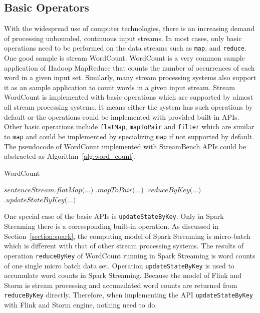 \subsection{Basic Operators}
\label{sub:basic_operator}

With the widespread use of computer technologies, there is an increasing demand of processing unbounded, continuous input streams. In most cases, only basic operations need to be performed on the data streams such as \texttt{map}, and \texttt{reduce}. One good sample is stream WordCount. WordCount is a very common sample application of Hadoop MapReduce that counts the number of occurrences of each word in a given input set\cite{MapReduce}. Similarly, many stream processing systems also support it as an sample application to count words in a  given input stream. Stream WordCount is implemented with basic operations which are supported by almost all stream processing systems. It means either the system has such operations by default or the operations could be implemented with provided built-in APIs. Other basic operations include \texttt{flatMap}, \texttt{mapToPair} and \texttt{filter} which are similar to \texttt{map} and could be implemented by specializing \texttt{map} if not supported by default. The pseudocode of WordCount implemented with StreamBench APIs could be abstracted as Algorithm~\ref{alg:word_count}.

\begin{algorithm}
\caption{WordCount}\label{euclid}
\label{alg:word_count}
\begin{algorithmic}[1]
\State $\textit{sentenceStream.flatMap(...)}$
\State \hspace{2.6cm} $\textit{.mapToPair(...)}$
\State \hspace{2.6cm} $\textit{.reduceByKey(...)}$
\State \hspace{2.6cm} $\textit{.updateStateByKey(...)}$

\end{algorithmic}
\end{algorithm}

One special case of the basic APIs is \texttt{updateStateByKey}. Only in Spark Streaming there is a corresponding built-in operation. As discussed in Section~\ref{section:spark}, the computing model of Spark Streaming is micro-batch which is different with that of other stream processing systems. The results of operation \texttt{reduceByKey} of WordCount running in Spark Streaming is word counts of one single micro batch data set. Operation \texttt{updateStateByKey} is used to accumulate word counts in Spark Streaming. Because the model of Flink and Storm is stream processing and accumulated word counts are returned from \texttt{reduceByKey} directly. Therefore, when implementing the API \texttt{updateStateByKey} with Flink and Storm engine, nothing need to do. 

